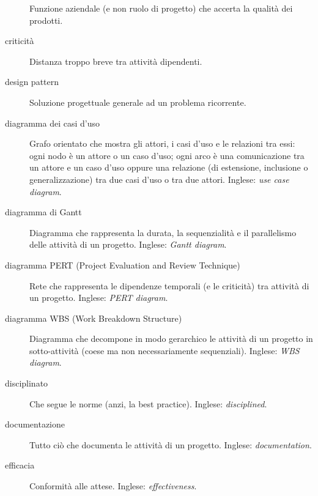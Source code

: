 \documentclass[a4paper]{article}
\begin{document}
\begin{description}
			Funzione aziendale (e non ruolo di progetto) che accerta la qualità dei prodotti.
			
	\item[criticità] 

			Distanza troppo breve tra attività dipendenti.
			
	\item[design pattern] 

			Soluzione progettuale generale ad un problema ricorrente.
			
	\item[diagramma dei casi d'uso] 

			Grafo orientato che mostra gli attori, i casi d'uso e le relazioni tra essi: ogni nodo è un attore o un caso d'uso; ogni arco è una comunicazione tra un attore e un caso d'uso oppure una relazione (di estensione, inclusione o generalizzazione) tra due casi d'uso o tra due attori. Inglese: \emph{use case diagram}.
			
	\item[diagramma di Gantt] 

			Diagramma che rappresenta la durata, la sequenzialità e il parallelismo delle attività di un progetto. Inglese: \emph{Gantt diagram}.
			
	\item[diagramma PERT (Project Evaluation and Review Technique)] 

			Rete che rappresenta le dipendenze temporali (e le criticità) tra attività di un progetto. Inglese: \emph{PERT diagram}.
			
	\item[diagramma WBS (Work Breakdown Structure)] 

			Diagramma che decompone in modo gerarchico le attività di un progetto in sotto-attività (coese ma non necessariamente sequenziali). Inglese: \emph{WBS diagram}.
			
	\item[disciplinato] 

			Che segue le norme (anzi, la best practice). Inglese: \emph{disciplined}.
			
	\item[documentazione] 

			Tutto ciò che documenta le attività di un progetto. Inglese: \emph{documentation}.
			
	\item[efficacia] 

			Conformità alle attese. Inglese: \emph{effectiveness}.
			

\end{description}
\end{document}
